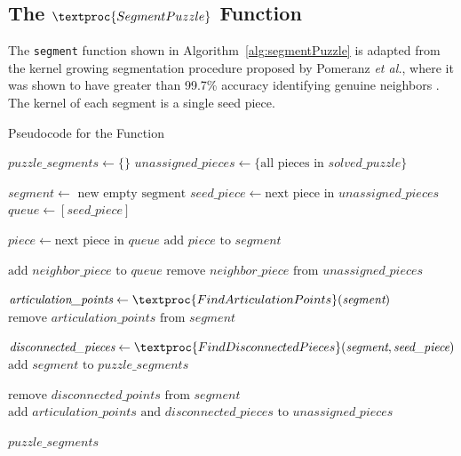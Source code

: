 \subsection{The $\textproc{SegmentPuzzle}$ Function}\label{sec:segmentPuzzle}

The \texttt{segment} function shown in Algorithm~\ref{alg:segmentPuzzle} is adapted from the kernel growing segmentation procedure proposed by Pomeranz \textit{et al.}, where it was shown to have greater than 99.7\% accuracy identifying genuine neighbors \cite{pomeranz2011}. The kernel of each segment is a single seed piece.

\begin{algorithm}
\caption{Pseudocode for the  Function}\label{alg:segmentPuzzle}
\begin{algorithmic}[1]
    \State $puzzle\_segments \gets \{ \}$
    \State $unassigned\_pieces \gets \{ \text{all pieces in } solved\_puzzle \}$
\item[]
        \State $segment \gets \text{ new empty segment}$
        \State $seed\_piece \gets \text{next piece in } unassigned\_pieces$
        \State $queue \gets [seed\_piece]$
\item[]
            \State $piece \gets \text{next piece in } queue$
            \State $\text{add } piece \text{ to } segment$
\item[]
            		\State $\text{add } neighbor\_piece \text{ to } \textit{queue}$
            		\State $\text{remove } neighbor\_piece \text{ from } unassigned\_pieces$
            	\EndIf
            \EndFor
        \EndWhile
\item[]
        \State $\textit{articulation\_points} \gets \textproc{FindArticulationPoints}(\textit{segment})$
        \State $\text{remove } \textit{articulation\_points} \text{ from } \textit{segment}$
\item[]
		\State $\textit{disconnected\_pieces} \gets \textproc{FindDisconnectedPieces}(\textit{segment},\textit{seed\_piece})$        
        \State $\text{add } segment \text{ to } puzzle\_segments$
\item[]
		\State $\text{remove } \textit{disconnected\_points} \text{ from } \textit{segment}$
        \State $\text{add } \textit{articulation\_points} \text{ and } \textit{disconnected\_pieces} \text{ to } \textit{unassigned\_pieces}$
    \EndWhile
\item[]
    \State \Return $\textit{puzzle\_segments}$
\EndFunction
\end{algorithmic}
\end{algorithm}

